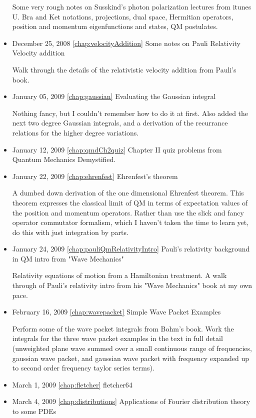 \begin{itemize}
Some very rough notes on Susskind's photon polarization lectures from itunes U.  Bra and Ket notations, projections, dual space, Hermitian operators, position and momentum eigenfunctions and states, QM postulates.\item December 25, 2008 \ref{chap:velocityAddition} Some notes on Pauli Relativity Velocity addition

Walk through the details of the relativistic velocity addition from Pauli's book.\item January 05, 2009 \ref{chap:gaussian} Evaluating the Gaussian integral

Nothing fancy, but I couldn't remember how to do it at first.  Also added the next two degree Gaussian integrals, and a derivation of the recurrance relations for the higher degree variations. \item January 12, 2009 \ref{chap:qmdCh2quiz} Chapter II quiz problems from Quantum Mechanics Demystified.

\item January 22, 2009 \ref{chap:ehrenfest} Ehrenfest's theorem

A dumbed down derivation of the one dimensional Ehrenfest theorem.  This theorem expresses the classical limit of QM in terms of expectation values of the position and momentum operators.  Rather than use the slick and fancy operator commutator formalism, which I haven't taken the time to learn yet, do this with just integration by parts. \item January 24, 2009 \ref{chap:pauliQmRelativityIntro} Pauli's relativity background in QM intro from "Wave Mechanics"

Relativity equations of motion from a Hamiltonian treatment.  A walk through of Pauli's relativity intro from his "Wave Mechanics" book at my own pace.\item February 16, 2009 \ref{chap:wavepacket} Simple Wave Packet Examples

Perform some of the wave packet integrals from Bohm's book.   Work the integrals for the three wave packet examples in the text in full detail (unweighted plane wave summed over a small continuous range of frequencies, gaussian wave packet, and gaussian wave packet with frequency expanded up to second order frequency taylor series terms).\item March 1, 2009 \ref{chap:fletcher} fletcher64

\item March 4, 2009 \ref{chap:distributions} Applications of Fourier distribution theory to some PDEs


\end{itemize}
